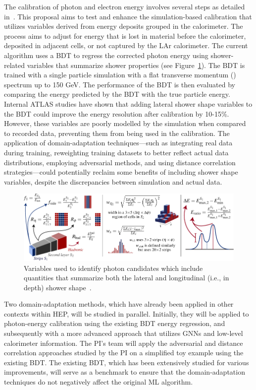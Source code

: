 \documentclass[letter, USenglish, 11pt, subfigure]{article}
\begin{document}
The calibration of photon and electron energy involves several steps as detailed in~\cite{atlascollaboration2023electron}. This proposal aims to test and enhance the simulation-based calibration that utilizes variables derived from energy deposits grouped in the calorimeter. The process aims to adjust for energy that is lost in material before the calorimeter, deposited in adjacent cells, or not captured by the LAr calorimeter. The current algorithm uses a BDT to regress the corrected photon energy using shower-related variables that summarize shower properties (see Figure~\ref{fig:showerVars}). The BDT is trained with a single particle simulation with a flat transverse momentum (\pt) spectrum up to 150 GeV. The performance of the BDT is then evaluated by comparing the energy predicted by the BDT with the true particle energy. Internal ATLAS studies have shown that adding lateral shower shape variables to the BDT could improve the energy resolution after calibration by 10-15\%. However, these variables are poorly modelled by the simulation when compared to recorded data, preventing them from being used in the calibration. The application of domain-adaptation techniques—such as integrating real data during training, reweighting training datasets to better reflect actual data distributions, employing adversarial methods, and using distance correlation strategies—could potentially reclaim some benefits of including shower shape variables, despite the discrepancies between simulation and actual data.

\begin{figure}[ht]
  \centering
  \includegraphics[width=\textwidth]{figures/photon_ID_variables.pdf}
  \caption{\label{fig:showerVars} Variables used to identify photon candidates which include quantities that summarize both the lateral and longitudinal (i.e., in depth) shower shape~\cite{atlascollaboration2023electron}. }
\end{figure}

Two domain-adaptation methods, which have already been applied in other contexts within HEP, will be studied in parallel. Initially, they will be applied to photon-energy calibration using the existing BDT energy regression, and subsequently with a more advanced approach that utilizes GNNs and low-level calorimeter information. The PI's team will apply the adversarial and distance correlation approaches studied by the PI on a simplified toy example using the existing BDT. The existing BDT, which has been extensively studied for various improvements, will serve as a benchmark to ensure that the domain-adaptation techniques do not negatively affect the original ML algorithm.
\end{document}
